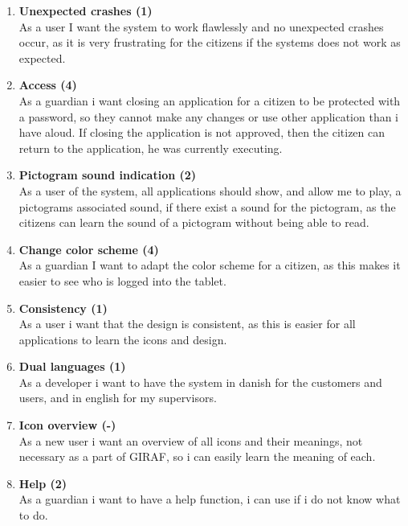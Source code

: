 \begin{enumerate}
	\item \textbf{Unexpected crashes (1)}\\
	As a user I want the system to work flawlessly and no unexpected crashes occur, as it is very frustrating for the citizens if the systems does not work as expected. 
	
	\item \textbf{Access (4)} \\
	As a guardian i want closing an application for a citizen to be protected with a password, so they cannot make any changes or use other application than i have aloud. If closing the application is not approved, then the citizen can return to the application, he was currently executing.
	
	\item \textbf{Pictogram sound indication (2)}\\
	As a user of the system, all applications should show, and allow me to play, a pictograms associated sound, if there exist a sound for the pictogram, as the citizens can learn the sound of a pictogram without being able to read. 
	
	\item \textbf{Change color scheme (4)}\\
	As a guardian I want to adapt the color scheme for a citizen, as this makes it easier to see who is logged into the tablet. 
	
	\item \textbf{Consistency (1)}\\
	As a user i want that the design is consistent, as this is easier for all applications to learn the icons and design.  
	
	\item \textbf{Dual languages (1)}\\
	As a developer i want to have the system in danish for the customers and users, and in english for my supervisors. 
	
	\item \textbf{Icon overview (-)} \\
	As a new user i want an overview of all icons and their meanings, not necessary as a part of GIRAF, so i can easily learn the meaning of each.
	
	\item \textbf{Help (2)}\\
	As a guardian i want to have a help function, i can use if i do not know what to do.
	

\end{enumerate}
